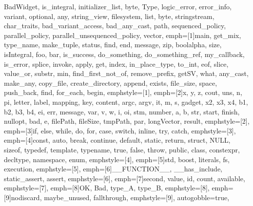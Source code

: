 {{              BadWidget, is_integral, initializer_list, byte, Type, logic_error,
              error_info, variant, optional, any, string_view, filesystem, list, byte,
              stringstream, char_traits, bad_variant_access, bad_any_cast, path,
              sequenced_policy, parallel_policy, parallel_unsequenced_policy, vector},
emph=[1]{main, get_mix, type_name, make_tuple, status, find, end, message, zip, boolalpha, size,
         isIntegral,  foo, bar, is_success, do_something, do_something_ref, my_callback, is_error,
         splice, invoke, apply, get, index, in_place_type, to_int, eof, slice, value_or,
         substr, min, find_first_not_of, remove_prefix, getSV, what, any_cast, make_any,
         copy_file, create_directory, append, exists, file_size, space, push_back, find,
         for_each, begin},
emphstyle=[1]{\color{NavyBlue}}, %
emph=[2]{x, y, z, cout, uns, n, pi, letter, label, mapping, key, content, argc, argv, it, m, s,
         gadget, x2, x3, x4, b1, b2, b3, b4, ei, err, message, var, v, w, i, oi, stm, number, a, b,
         str, start, finish, nullopt, bad, e, filePath, fileSize, tmpPath, par, longVector, result},
emphstyle=[2]{\color{Orange}}, %
emph=[3]{if, else, while, do, for, case, switch, inline, try, catch},
emphstyle=[3]{\color{violet}}, %
emph=[4]{const, auto, break, continue, default, static, return, struct, NULL, sizeof, typedef,
         template, typename, true, false, throw, public, class, constexpr, decltype, namespace, enum},
emphstyle=[4]{\color{ProcessBlue}}, %
emph=[5]{std, boost, literals, fs, execution},
emphstyle=[5]{\color{Maroon}}, %
emph=[6]{__FUNCTION__, __has_include, static_assert, assert},
emphstyle=[6]{\color{Gray}}, %
emph=[7]{second, value, id, count, available},
emphstyle=[7]{\color{Peach!50!Purple}}, %
emph=[8]{OK, Bad, type_A, type_B},
emphstyle=[8]{\color{Blue}}, %
emph=[9]{nodiscard, maybe_unused, fallthrough},
emphstyle=[9]{\color{Goldenrod!50!black}}, %
autogobble=true, %
}


